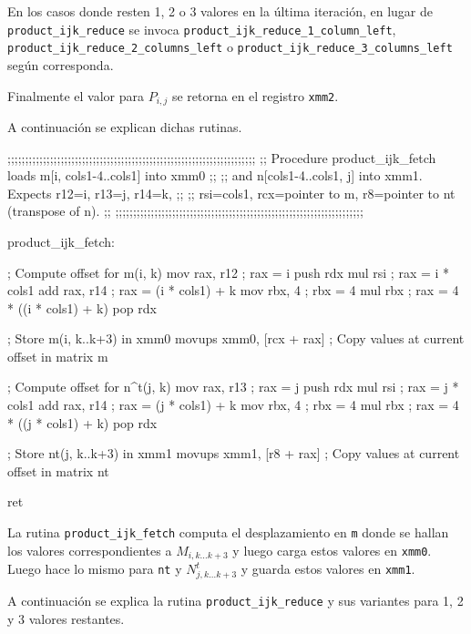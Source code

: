 \documentclass[a4paper, 10pt, twoside]{article}
\newcommand{\cc}[1]{\texttt{#1}}
\begin{document}
En los casos donde resten 1, 2 o 3 valores en la última iteración, en lugar de
\cc{product\_ijk\_reduce} se invoca \cc{product\_ijk\_reduce\_1\_column\_left},
\cc{product\_ijk\_reduce\_2\_columns\_left} o
\cc{product\_ijk\_reduce\_3\_columns\_left} según corresponda.

Finalmente el valor para $P_{i,j}$ se retorna en el registro \cc{xmm2}.

A continuación se explican dichas rutinas.

\begin{code}
  ;;;;;;;;;;;;;;;;;;;;;;;;;;;;;;;;;;;;;;;;;;;;;;;;;;;;;;;;;;;;;;;;;;;;;;
  ;; Procedure product_ijk_fetch loads m[i, cols1-4..cols1] into xmm0 ;;
  ;; and n[cols1-4..cols1, j] into xmm1. Expects r12=i, r13=j, r14=k, ;;
  ;; rsi=cols1, rcx=pointer to m, r8=pointer to nt (transpose of n).  ;;
  ;;;;;;;;;;;;;;;;;;;;;;;;;;;;;;;;;;;;;;;;;;;;;;;;;;;;;;;;;;;;;;;;;;;;;;

  product_ijk_fetch:

    ; Compute offset for m(i, k)
    mov rax, r12              ; rax = i
    push rdx
    mul rsi                   ; rax = i * cols1
    add rax, r14              ; rax = (i * cols1) + k
    mov rbx, 4                ; rbx = 4
    mul rbx                   ; rax = 4 * ((i * cols1) + k)
    pop rdx

    ; Store m(i, k..k+3) in xmm0
    movups xmm0, [rcx + rax]  ; Copy values at current offset in matrix m

    ; Compute offset for n^t(j, k)
    mov rax, r13              ; rax = j
    push rdx
    mul rsi                   ; rax = j * cols1
    add rax, r14              ; rax = (j * cols1) + k
    mov rbx, 4                ; rbx = 4
    mul rbx                   ; rax = 4 * ((j * cols1) + k)
    pop rdx

    ; Store nt(j, k..k+3) in xmm1
    movups xmm1, [r8 + rax]  ; Copy values at current offset in matrix nt

    ret
\end{code}

La rutina \cc{product\_ijk\_fetch} computa el desplazamiento en \cc{m} donde se
hallan los valores correspondientes a $M_{i,k \ldots k+3}$ y luego carga estos
valores en \cc{xmm0}. Luego hace lo mismo para \cc{nt} y $N^{t}_{j,k \ldots
k+3}$ y guarda estos valores en \cc{xmm1}.

A continuación se explica la rutina \cc{product\_ijk\_reduce} y sus variantes
para 1, 2 y 3 valores restantes.
\end{document}
